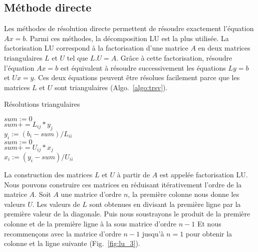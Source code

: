 \subsection{Méthode directe}
Les méthodes de résolution directe permettent de résoudre exactement l'équation $Ax=b$.
%
Parmi ces méthodes, la décomposition LU est la plus utilisée.
%
La factorisation LU correspond à la factorisation d'une matrice $A$ en deux matrices triangulaires $L$ et $U$ tel que $L.U=A$.
%
Grâce à cette factorisation, résoudre l'équation $Ax=b$ est équivalent à résoudre successivement les équations $Ly=b$ et $Ux=y$.
%
Ces deux équations peuvent être résolues facilement parce que les matrices $L$ et $U$ sont triangulaires (Algo.~\ref{algo:trsv}).

\begin{algorithm}
  \caption{Résolutions triangulaires}
  \label{algo:trsv}
   {
    $sum := 0$\\
     {
      $sum += L_{ij} * y_j$ \\
    }
    $y_i := (b_i-sum)/L_{ii}$ \\
  }
   {
    $sum := 0$\\
     {
      $sum += U_{ij} * x_j$ \\
    }
    $x_i := (y_i-sum)/U_{ii}$ \\
  }
\end{algorithm}


La construction des matrices $L$ et $U$ à partir de $A$ est appelée factorisation LU.
%
Nous pouvons construire ces matrices en réduisant itérativement l'ordre de la matrice $A$.
%
Soit $A$ une matrice d'ordre $n$, la première colonne nous donne les valeurs $U$.
%
Les valeurs de $L$ sont obtenues en divisant la première ligne par la première valeur de la diagonale.
%
Puis nous soustrayons le produit de la première colonne et de la première ligne à la sous matrice d'ordre $n-1$
%
Et nous recommençons avec la matrice d'ordre $n-1$ jusqu'à $n=1$ pour obtenir la colonne et la ligne suivante (Fig.~\ref{fig:lu_3}).


